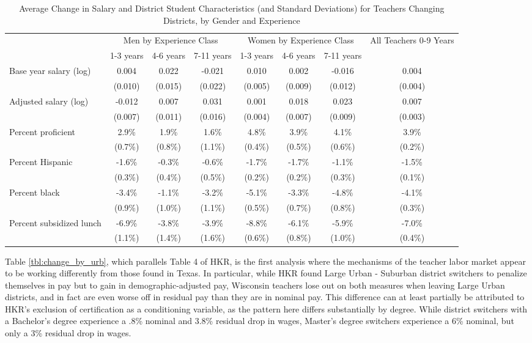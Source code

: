 \documentclass[]{article}
\begin{document}
\begin{sidewaystable}[htbp]
\centering
\begin{tabular}{lccccccc}
  \hline
 & \multicolumn{3}{c}{Men by Experience Class} & \multicolumn{3}{c}{Women by Experience Class} & \multirow{2}{*}{\parbox{0.09\linewidth}{All Teachers 0-9 Years}}\\ \cline{2-4} \cline{5-7}
 & 1-3 years & 4-6 years & 7-11 years & 1-3 years & 4-6 years & 7-11 years &  \\ 
  \hline
Base year salary (log) & 0.004 & 0.022 & -0.021 & 0.010 & 0.002 & -0.016 & 0.004 \\ 
   & (0.010) & (0.015) & (0.022) & (0.005) & (0.009) & (0.012) & (0.004) \\ 
  Adjusted salary (log) & -0.012 & 0.007 & 0.031 & 0.001 & 0.018 & 0.023 & 0.007 \\ 
   & (0.007) & (0.011) & (0.016) & (0.004) & (0.007) & (0.009) & (0.003) \\ 
  Percent proficient & 2.9\% & 1.9\% & 1.6\% & 4.8\% & 3.9\% & 4.1\% & 3.9\% \\ 
   & (0.7\%) & (0.8\%) & (1.1\%) & (0.4\%) & (0.5\%) & (0.6\%) & (0.2\%) \\ 
  Percent Hispanic & -1.6\% & -0.3\% & -0.6\% & -1.7\% & -1.7\% & -1.1\% & -1.5\% \\ 
   & (0.3\%) & (0.4\%) & (0.5\%) & (0.2\%) & (0.2\%) & (0.3\%) & (0.1\%) \\ 
  Percent black & -3.4\% & -1.1\% & -3.2\% & -5.1\% & -3.3\% & -4.8\% & -4.1\% \\ 
   & (0.9\%) & (1.0\%) & (1.1\%) & (0.5\%) & (0.7\%) & (0.8\%) & (0.3\%) \\ 
  Percent subsidized lunch & -6.9\% & -3.8\% & -3.9\% & -8.8\% & -6.1\% & -5.9\% & -7.0\% \\ 
   & (1.1\%) & (1.4\%) & (1.6\%) & (0.6\%) & (0.8\%) & (1.0\%) & (0.4\%) \\ 
   \hline
\end{tabular}
\caption{Average Change in Salary and District Student Characteristics (and Standard Deviations) for Teachers Changing Districts, by Gender and Experience} 
\label{tbl:change_by_ge}
\end{sidewaystable}

Table \ref{tbl:change_by_urb}, which parallels Table 4 of HKR, is the
first analysis where the mechanisms of the teacher labor market appear
to be working differently from those found in Texas. In particular,
while HKR found Large Urban - Suburban district switchers to penalize
themselves in pay but to gain in demographic-adjusted pay, Wisconsin
teachers lose out on both measures when leaving Large Urban districts,
and in fact are even worse off in residual pay than they are in nominal
pay. This difference can at least partially be attributed to HKR's
exclusion of certification as a conditioning variable, as the pattern
here differs substantially by degree. While district switchers with a
Bachelor's degree experience a .8\% nominal and 3.8\% residual drop in
wages, Master's degree switchers experience a 6\% nominal, but only a
3\% residual drop in wages.
\end{document}
